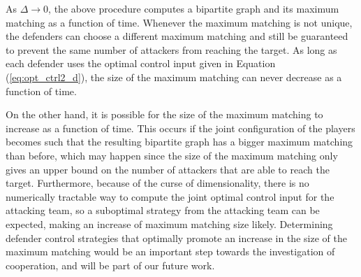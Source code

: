 As $\Delta\rightarrow 0$, the above procedure computes a bipartite graph and its maximum matching as a function of time. Whenever the maximum matching is not unique, the defenders can choose a different maximum matching and still be guaranteed to prevent the same number of attackers from reaching the target. As long as each defender uses the optimal control input given in Equation (\ref{eq:opt_ctrl2_d}), the size of the maximum matching can never decrease as a function of time. 

On the other hand, it is possible for the size of the maximum matching to increase as a function of time. This occurs if the joint configuration of the players becomes such that the resulting bipartite graph has a bigger maximum matching than before, which may happen since the size of the maximum matching only gives an upper bound on the number of attackers that are able to reach the target. Furthermore, because of the curse of dimensionality, there is no numerically tractable way to compute the joint optimal control input for the attacking team, so a suboptimal strategy from the attacking team can be expected, making an increase of maximum matching size likely. Determining defender control strategies that optimally promote an increase in the size of the maximum matching would be an important step towards the investigation of cooperation, and will be part of our future work.
